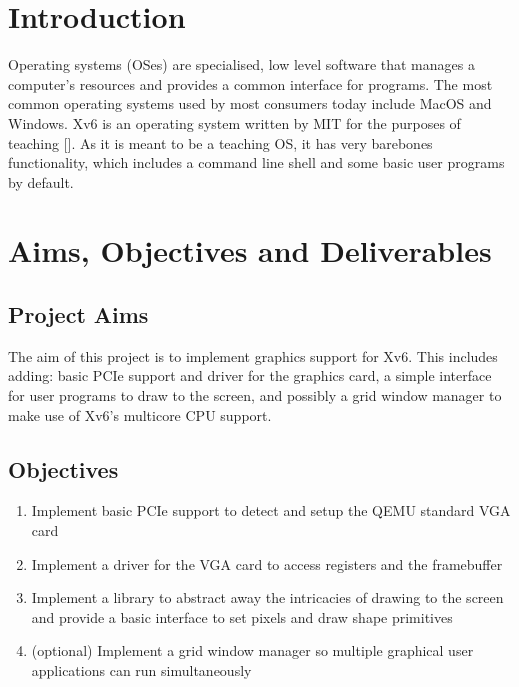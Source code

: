 %
%
\section{Introduction}

Operating systems (OSes) are specialised, low level software that manages a computer's
resources and provides a common interface for programs. The most common operating
systems used by most consumers today include MacOS and Windows. Xv6 is an operating
system written by MIT for the purposes of teaching [\iffalse TODO: add ref \fi].
As it is meant to be a teaching OS, it has very barebones functionality,
which includes a command line shell and some basic user programs by default.


%
%
\section{Aims, Objectives and Deliverables}

\subsection{Project Aims}

The aim of this project is to implement graphics support for Xv6. This includes
adding: basic PCIe support and driver for the graphics card, a simple interface
for user programs to draw to the screen, and possibly a grid window manager
to make use of Xv6's multicore CPU support.

\subsection{Objectives}

\begin{enumerate}
    \item{Implement basic PCIe support to detect and setup the QEMU standard VGA card}
    \item{Implement a driver for the VGA card to access registers and the framebuffer}
    \item{Implement a library to abstract away the intricacies of drawing to the screen and provide a basic interface to set pixels and draw shape primitives}
    \item{(optional) Implement a grid window manager so multiple graphical user applications can run simultaneously}
\end{enumerate}

